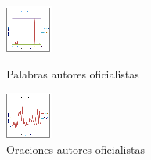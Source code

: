 \documentclass[a4paper,10pt]{article}
\begin{document}
\begin{figure}%
	\begin{minipage}[b]{0.5\linewidth}
	\centering
	\includegraphics[width=\linewidth]{figura1pal_of.eps}
	\caption{Palabras autores oficialistas}
	\label{fig:figura1}
	\end{minipage}
	\hspace{0.2cm}
\begin{minipage}[b]{0.5\linewidth}
	\centering
	\includegraphics[width=\linewidth]{figura2ora_of.eps}
	\caption{Oraciones autores oficialistas}
	\label{fig:figura1}
\end{minipage}
\hspace{0.5cm}

\end{figure}
\end{document}
